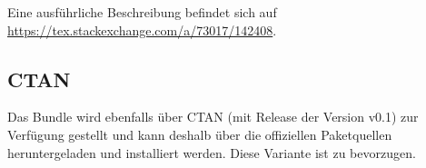 \documentclass[babel=ngerman,highlight=false]{skdoc}
\begin{document}
                Eine ausführliche Beschreibung befindet sich auf \url{https://tex.stackexchange.com/a/73017/142408}.

        \subsection{CTAN}
            Das Bundle wird ebenfalls über CTAN (mit Release der Version v0.1) zur Verfügung gestellt und kann deshalb über die offiziellen Paketquellen heruntergeladen und installiert werden. Diese Variante ist zu bevorzugen.
            
    \PrintChanges

    \PrintIndex
\end{document}
